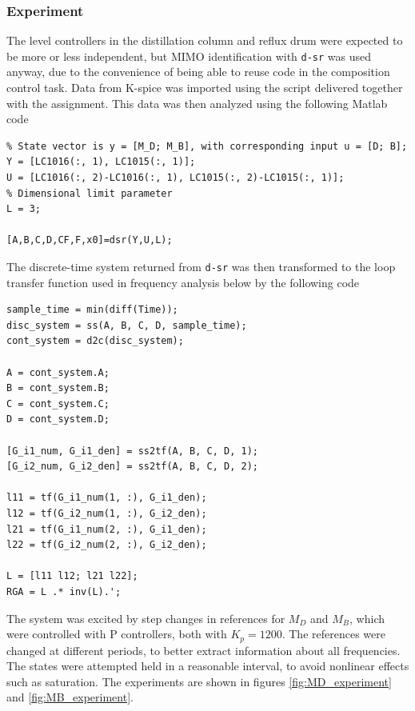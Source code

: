 \documentclass[12pt]{article}
\begin{document}
\subsubsection{Experiment}
The level controllers in the distillation column and reflux drum were expected to be more or less independent, but MIMO identification with \texttt{d-sr} was used anyway, due to the convenience of being able to reuse code in the composition control task. Data from K-spice was imported using the script delivered together with the assignment. This data was then analyzed using the following Matlab code

\begin{verbatim}
% State vector is y = [M_D; M_B], with corresponding input u = [D; B];
Y = [LC1016(:, 1), LC1015(:, 1)];
U = [LC1016(:, 2)-LC1016(:, 1), LC1015(:, 2)-LC1015(:, 1)];
% Dimensional limit parameter
L = 3;

[A,B,C,D,CF,F,x0]=dsr(Y,U,L);
\end{verbatim}

The discrete-time system returned from \texttt{d-sr} was then transformed to the loop transfer function used in frequency analysis below by the following code

\begin{verbatim}
sample_time = min(diff(Time));
disc_system = ss(A, B, C, D, sample_time);
cont_system = d2c(disc_system);

A = cont_system.A;
B = cont_system.B;
C = cont_system.C;
D = cont_system.D;

[G_i1_num, G_i1_den] = ss2tf(A, B, C, D, 1);
[G_i2_num, G_i2_den] = ss2tf(A, B, C, D, 2);

l11 = tf(G_i1_num(1, :), G_i1_den);
l12 = tf(G_i2_num(1, :), G_i2_den);
l21 = tf(G_i1_num(2, :), G_i1_den);
l22 = tf(G_i2_num(2, :), G_i2_den);

L = [l11 l12; l21 l22];
RGA = L .* inv(L).';
\end{verbatim}

The system was excited by step changes in references for $M_D$ and $M_B$, which were controlled with P controllers, both with $K_p = 1200$. The references were changed at different periods, to better extract information about all frequencies. The states were attempted held in a reasonable interval, to avoid nonlinear effects such as saturation. The experiments are shown in figures \ref{fig:MD_experiment} and \ref{fig:MB_experiment}.
\end{document}
